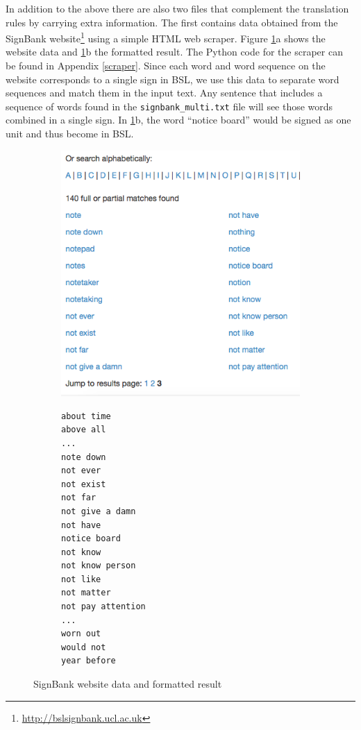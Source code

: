 \documentclass[12pt]{ociamthesis}  %
\begin{document}
In addition to the above there are also two files that complement the translation rules by carrying extra  information. The first contains data obtained from the SignBank website\footnote{\url{http://bslsignbank.ucl.ac.uk}} using a simple HTML web scraper. Figure \ref{fig:signbank}a shows the website data and \ref{fig:signbank}b the formatted result. The Python code for the scraper can be found in Appendix \ref{scraper}. Since each word and word sequence on the website corresponds to a single sign in BSL, we use this data to separate word sequences and match them in the input text. Any sentence that includes a sequence of words found in the \texttt{signbank\_multi.txt} file will see those words combined in a single sign. In \ref{fig:signbank}b, the word ``notice board'' would be signed as one unit and thus become  in BSL.
\begin{figure}[H]
\centering
\begin{subfigure}[b]{.5\textwidth}
  \hspace*{-0.5cm}
  \includegraphics[scale=0.55]{chapter4/signbank}
  \caption{}
\end{subfigure}
\qquad
\begin{subfigure}[b]{.4\textwidth}
  \small
    \begin{lstlisting}[language=Rules,mathescape=true]
about time
above all
...
note down
not ever
not exist
not far
not give a damn
not have
notice board
not know
not know person
not like
not matter
not pay attention
...
worn out
would not
year before
\end{lstlisting}
  \caption{}
\end{subfigure}
\caption{SignBank website data and formatted result}
\label{fig:signbank}
\end{figure}
\end{document}
